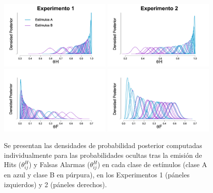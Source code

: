 \begin{figure}[h]
\centering
\includegraphics[width=0.49\textwidth]{Figures/MTau_Hits_E1} 
\includegraphics[width=0.49\textwidth]{Figures/MTau_Hits_E2}\\
\includegraphics[width=0.49\textwidth]{Figures/MTau_FA_E1}
\includegraphics[width=0.49\textwidth]{Figures/MTau_FA_E2}\\
\decoRule
\caption[Modelo Tau: Inferencias individuales para el valor de la probabilidad de cometer un Hit en cada clase de estímulos]{Se presentan las densidades de probabilidad posterior computadas individualmente para las probabilidades ocultas tras la emisión de Hits ($\theta^H_{ij}$) y Falsas Alarmas ($\theta^H_{ij}$) en cada clase de estímulos (clase A en azul y clase B en púrpura), en los Experimentos 1 (páneles izquierdos) y 2 (páneles derechos).}
\label{fig:Tau_Hits}
\end{figure}


